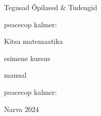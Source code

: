 \begin{titlepage}
\par{Tegusad Õpilased \& Tudengid}
\vspace{0.3\textheight}
\par{peacecop kalmer:}
\LARGE
\par{Kitsa matemaatika}
\par{esimene kursus}
\normalsize
\par{manual}
\vspace{0.3\textheight}
\begin{flushright}
\par{peacecop kalmer:}
\end{flushright}
\vfill
Narva
\hfill
2024
\end{titlepage}
